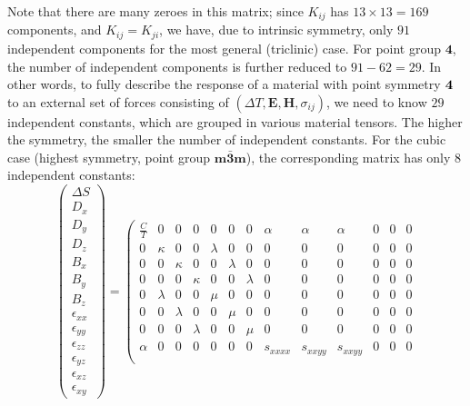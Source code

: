 Note that there are many zeroes in this matrix; since $K_{ij}$ has $13\times 13=169$ components, and $K_{ij}=K_{ji}$, we have, due to intrinsic symmetry, only $91$ independent components for the most general (triclinic) case.  For point group $\textbf{4}$, the number of independent components is further reduced to $91-62=29$.  In other words, to fully describe the response of a material with point symmetry $\hm{4}$ to an external set of forces consisting of $(\Delta T, \mathbf{E}, \mathbf{H}, \sigma_{ij})$, we need to know $29$ independent constants, which are grouped in various material tensors.  The higher the symmetry, the smaller the number of independent constants.  For the cubic case (highest symmetry, point group $\mathbf{m\bar{3}m}$), the corresponding matrix has only $8$ independent constants:
{\small\begin{equation}
	\left(\begin{matrix}
	\Delta S\\\hline D_x\\ D_y\\ D_z\\\hline B_x\\ B_y\\ B_z\\\hline \epsilon_{xx}\\ \epsilon_{yy}\\ \epsilon_{zz}\\ \epsilon_{yz}\\ \epsilon_{xz}\\ \epsilon_{xy}\end{matrix}\right) = 
	\left(\begin{array}{c|ccc|ccc|cccccc}
	\frac{C}{T} & 0 & 0 & 0 & 0 & 0 & 0 & \alpha & \alpha & \alpha & 0 & 0 &0\\\hline
	0 & \kappa & 0 & 0 & \lambda & 0 & 0  & 0 & 0 & 0 & 0 & 0 & 0\\
	0 & 0 & \kappa & 0 & 0 & \lambda & 0 & 0 & 0 & 0 & 0 & 0 & 0\\
	0 & 0 & 0 & \kappa & 0 & 0 & \lambda                   & 0 & 0 & 0 & 0 & 0 & 0\\\hline
	0 & \lambda & 0   & 0 & \mu & 0 & 0  &0 & 0 & 0 & 0 & 0 & 0\\
	0 & 0 & \lambda    & 0 & 0 & \mu & 0  &0 &0 & 0 & 0 & 0 & 0\\
	0 & 0 & 0 & \lambda                      & 0 & 0 & \mu &0 & 0 & 0 & 0 & 0 & 0\\\hline
	\alpha & 0 & 0 & 0     & 0 & 0 & 0                      & s_{xxxx} & s_{xxyy} & s_{xxyy} & 0 & 0 & 0\\

\end{array}
\end{equation}}
